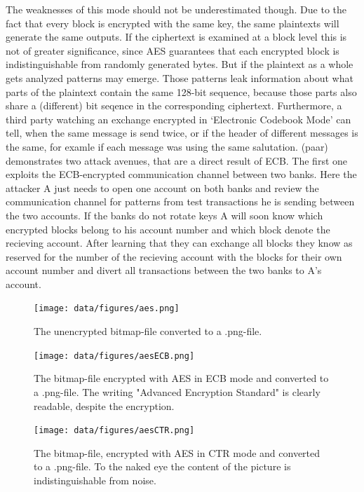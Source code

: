 The weaknesses of this mode
should not be underestimated though. Due to the fact that every block is
encrypted with the same key, the same plaintexts will generate the same
outputs. If the ciphertext is examined at a block level this is not of
greater significance, since AES guarantees that each encrypted block is
indistinguishable from randomly generated bytes. But if the plaintext as
a whole gets analyzed patterns may emerge. Those patterns leak
information about what parts of the plaintext contain the same 128-bit
sequence, because those parts also share a (different) bit seqence in
the corresponding ciphertext. Furthermore, a third party watching an
exchange encrypted in `Electronic Codebook Mode' can tell, when the same
message is send twice, or if the header of different messages is the
same, for examle if each message was using the same salutation. (paar)
demonstrates two attack avenues, that are a direct result of ECB. The
first one exploits the ECB-encrypted communication channel between two
banks. Here the attacker A just needs to open one account on both banks
and review the communication channel for patterns from test transactions
he is sending between the two accounts. If the banks do not rotate keys
A will soon know which encrypted blocks belong to his account number and
which block denote the recieving account. After learning that they can
exchange all blocks they know as reserved for the number of the
recieving account with the blocks for their own account number and
divert all transactions between the two banks to A's account.

\begin{figure}
\centering
\texttt{[image: data/figures/aes.png]} 
\caption{The unencrypted bitmap-file converted to a .png-file.}
\end{figure}

\begin{figure}
\centering
\texttt{[image: data/figures/aesECB.png]} 
\caption{The bitmap-file encrypted with AES in ECB mode and converted to a .png-file. The writing "Advanced Encryption Standard" is clearly readable, despite the encryption.}
\end{figure}

\begin{figure}
\centering
\texttt{[image: data/figures/aesCTR.png]} 
\caption{The bitmap-file, encrypted with AES in CTR mode and converted to a .png-file. To the naked eye the content of the picture is indistinguishable from noise.}
\end{figure}

